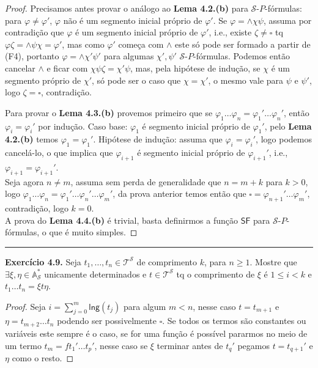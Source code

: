 \documentclass[11pt]{article}
\theoremstyle{definition}
\newcommand{\mc}[1]{\mathcal{#1}}
\newcommand{\msf}[1]{\mathsf{#1}}
\newcommand{\mbb}[1]{\mathbb{#1}}
\begin{document}
\begin{proof}
    Precisamos antes provar o análogo ao \textbf{Lema 4.2.(b)} para $\mc{S}$-$P$-fórmulas: para $\varphi\ne\varphi'$, $\varphi$ não é um segmento inicial próprio de $\varphi'$. Se $\varphi=\wedge\chi\psi$, assuma por contradição que $\varphi$ é um segmento inicial próprio de $\varphi'$, i.e., existe $\zeta\ne\square$ tq $\varphi\zeta=\wedge\psi\chi=\varphi'$, mas como $\varphi'$ começa com $\wedge$ este só pode ser formado a partir de (F4), portanto $\varphi=\wedge\chi'\psi'$ para algumas $\chi',\psi'$ $\mc{S}$-$P$-fórmulas. Podemos então cancelar $\wedge$ e ficar com $\chi\psi\zeta=\chi'\psi$, mas, pela hipótese de indução, se $\chi$ é um segmento próprio de $\chi'$, só pode ser o caso que $\chi=\chi'$, o mesmo vale para $\psi$ e $\psi'$, logo $\zeta=\square$, contradição.
    
    Para provar o \textbf{Lema 4.3.(b)} provemos primeiro que se $\varphi_1\dots\varphi_n=\varphi_1'\dots\varphi_n'$, então $\varphi_i=\varphi_i'$ por indução. Caso base: $\varphi_1$ é segmento inicial próprio de $\varphi_1'$, pelo \textbf{Lema 4.2.(b)} temos $\varphi_1=\varphi_1'$. Hipótese de indução: assuma que $\varphi_i=\varphi_i'$, logo podemos cancelá-lo, o que implica que $\varphi_{i+1}$ é segmento inicial próprio de $\varphi_{i+1}'$, i.e., $\varphi_{i+1}=\varphi_{i+1}'$.\\
    Seja agora $n\ne m$, assuma sem perda de generalidade que $n = m + k$ para $k > 0$, logo $\varphi_1\dots\varphi_n=\varphi_1'\dots\varphi_n'\dots\varphi_m'$, da prova anterior temos então que $\square=\varphi_{n+1}'\dots\varphi_m'$, contradição, logo $k = 0$.\\
    A prova do \textbf{Lema 4.4.(b)} é trivial, basta definirmos a função $\msf{SF}$ para $\mc{S}$-$P$-fórmulas, o que é muito simples.
\end{proof}

\hrule

\textbf{Exercício 4.9.} Seja $t_1,\dots,t_n\in\mc{T}^\mc{S}$ de comprimento $k$, para $n\ge1$. Mostre que $\exists\xi,\eta\in\mbb{A}^*_\mc{S}$ unicamente determinados e $t\in\mc{T}^\mc{S}$ tq o comprimento de $\xi$ é $1\le i<k$ e $t_1\dots t_n = \xi t\eta$.

\begin{proof}
    Seja $i=\sum_{j=0}^m\msf{lng}(t_j)$ para algum $m<n$, nesse caso $t=t_{m+1}$ e $\eta=t_{m+2}\dots t_{n}$ podendo ser possivelmente $\square$. Se todos os termos são constantes ou variáveis este sempre é o caso, se for uma função é possível pararmos no meio de um termo $t_m=ft_1'\dots t_p'$, nesse caso se $\xi$ terminar antes de $t_q'$ pegamos $t=t_{q+1}'$ e $\eta$ como o resto.
\end{proof}
\end{document}
